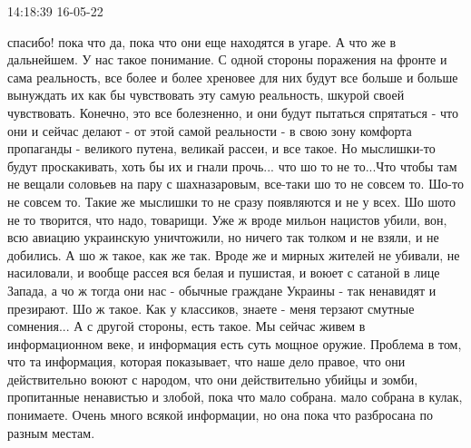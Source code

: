 14:18:39 16-05-22

спасибо! пока что да, пока что они еще находятся в угаре. А что же в
дальнейшем. У нас такое понимание. С одной стороны поражения на фронте и сама
реальность, все более и более хреновее для них будут все больше и больше
вынуждать их как бы чувствовать эту самую реальность, шкурой своей
чувствовать. Конечно, это все болезненно, и они будут пытаться спрятаться -
что они и сейчас делают - от этой самой реальности - в свою зону комфорта
пропаганды - великого путена, великай рассеи, и все такое. Но мыслишки-то
будут проскакивать, хоть бы их и гнали прочь... что шо то не то...Что чтобы
там не вещали соловьев на пару с шахназаровым, все-таки шо то не совсем то.
Шо-то не совсем то. Такие же мыслишки то не сразу появляются и не у всех. Шо
шото не то творится, что надо, товарищи. Уже ж вроде мильон нацистов убили,
вон, всю авиацию украинскую уничтожили, но ничего так толком и не взяли, и не
добились. А шо ж такое, как же так. Вроде же и мирных жителей не убивали, не
насиловали, и вообще рассея вся белая и пушистая, и воюет с сатаной в лице
Запада, а чо ж тогда они нас - обычные граждане Украины - так ненавидят и
презирают. Шо ж такое. Как у классиков, знаете - меня терзают смутные
сомнения... А с другой стороны, есть такое. Мы сейчас живем в информационном
веке, и информация есть суть мощное оружие. Проблема в том, что та информация,
которая показывает, что наше дело правое, что они действительно воюют с
народом, что они действительно убийцы и зомби, пропитанные ненавистью и
злобой, пока что мало собрана. мало собрана в кулак, понимаете. Очень много
всякой информации, но она пока что разбросана по разным местам. 

